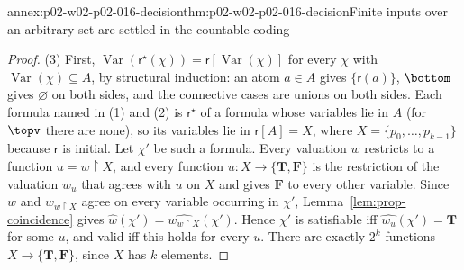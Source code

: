 \begin{annexitem}{annex:p02-w02-p02-016-decision}{thm:p02-w02-p02-016-decision}{Finite inputs over an arbitrary set are settled in the countable coding}
\begin{proof}
(3) First, \(\operatorname{Var}(\mathsf r^{\star}(\chi))=\mathsf r[\operatorname{Var}(\chi)]\)
for every \(\chi\) with \(\operatorname{Var}(\chi)\subseteq A\), by
structural induction: an atom \(a\in A\) gives \(\{\mathsf r(a)\}\), \(\bottom\)
gives \(\varnothing\) on both sides, and the connective cases are unions on
both sides.  Each formula named in (1) and (2) is \(\mathsf r^{\star}\) of a
formula whose variables lie in \(A\) (for \(\topv\) there are none), so its
variables lie in \(\mathsf r[A]=X\), where \(X=\{p_0,\ldots,p_{k-1}\}\) because
\(\mathsf r\) is initial.  Let \(\chi'\) be such a formula.  Every valuation
\(w\) restricts to a function \(u=w\restriction X\), and every function
\(u:X\to\{\mathbf T,\mathbf F\}\) is the restriction of the valuation \(w_u\)
that agrees with \(u\) on \(X\) and gives \(\mathbf F\) to every other
variable.  Since \(w\) and \(w_{w\restriction X}\) agree on every variable
occurring in \(\chi'\), Lemma~\ref{lem:prop-coincidence} gives
\(\widehat w(\chi')=\widehat{w_{w\restriction X}}(\chi')\).  Hence \(\chi'\) is
satisfiable iff \(\widehat{w_u}(\chi')=\mathbf T\) for some \(u\), and valid iff
this holds for every \(u\).  There are exactly \(2^k\) functions
\(X\to\{\mathbf T,\mathbf F\}\), since \(X\) has \(k\) elements.
\end{proof}
\end{annexitem}

